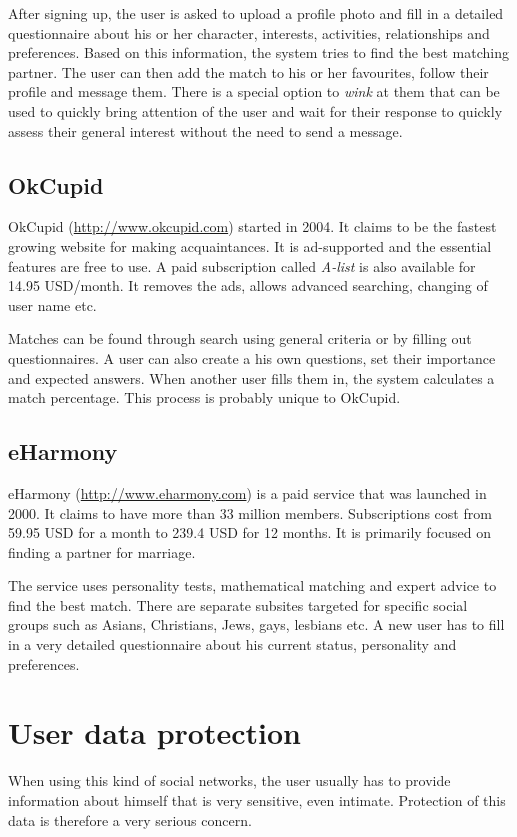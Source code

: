 \documentclass[12pt,oneside]{fithesis}
\begin{document}
		After signing up, the user is asked to upload a profile photo and fill in a detailed questionnaire about his or her character, interests, activities, relationships and preferences. Based on this information, the system tries to find the best matching partner. The user can then add the match to his or her favourites, follow their profile and message them. There is a special option to \emph{wink} at them that can be used to quickly bring attention of the user and wait for their response to quickly assess their general interest without the need to send a message. \cite{website:match}
		
		\subsection{OkCupid}
		OkCupid (\url{http://www.okcupid.com}) started in 2004. It claims to be the fastest growing website for making acquaintances.
		It is ad-supported and the essential features are free to use. A paid subscription called \emph{A-list} is also available for 14.95 USD/month. It removes the ads, allows advanced searching, changing of user name etc.
		
		Matches can be found through search using general criteria or by filling out questionnaires. A user can also create a his own questions, set their importance and expected answers. When another user fills them in, the system calculates a match percentage. This process is probably unique to OkCupid. \cite{website:okcupid}
		\subsection{eHarmony}
		eHarmony (\url{http://www.eharmony.com}) is a paid service that was launched in 2000. It claims to have more than 33 million members. Subscriptions cost from 59.95 USD for a month  to 239.4 USD for 12 months. It is primarily focused on finding a partner for marriage.
		
		The service uses personality tests, mathematical matching and expert advice to find the best match. There are separate subsites targeted for specific social groups such as Asians, Christians, Jews, gays, lesbians etc. A new user has to fill in a very detailed questionnaire about his current status, personality and preferences.\cite{website:eharmony}
\section{User data protection}
	When using this kind of social networks, the user usually has to provide information about himself that is very sensitive, even intimate. Protection of this data is therefore a very serious concern.
	
\end{document}
